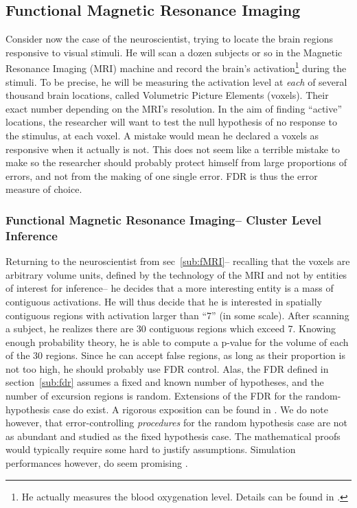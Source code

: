 \documentclass[review,12pt]{article}
\begin{document}
\subsection{\label{sub:fMRI}Functional Magnetic Resonance Imaging}

Consider now the case of the neuroscientist, trying to locate the brain regions responsive to visual stimuli. He will scan a dozen subjects or so in the Magnetic Resonance Imaging (MRI) machine and record the brain's activation\footnote{ He actually measures the blood oxygenation level. Details can be found in \cite{lazar_statistical_2008}.} during the stimuli. To be precise, he will be measuring the activation level at \emph{each} of several thousand brain locations, called Volumetric Picture Elements (voxels). Their exact number depending on the MRI's resolution. 
In the aim of finding ``active'' locations, the researcher will want to test the null hypothesis of no response to the stimulus, at each voxel. A mistake would mean he declared a voxels as responsive when it actually is not. This does not seem like a terrible mistake to make so the researcher should probably protect himself from large proportions of errors, and not from the making of one single error. FDR is thus the error measure of choice.


\subsubsection{Functional Magnetic Resonance Imaging-- Cluster Level Inference}
Returning to the neuroscientist from sec~\ref{sub:fMRI}-- recalling that the voxels are arbitrary volume units, defined by the technology of the MRI and not by entities of interest for inference-- he decides that a more interesting entity is a mass of contiguous activations. He will thus decide that he is interested in spatially contiguous regions with activation larger than ``7'' (in some scale). After scanning a subject, he realizes there are 30 contiguous regions which exceed 7. Knowing enough probability theory, he is able to compute a p-value for the volume of each of the 30 regions. Since he can accept false regions, as long as their proportion is not too high, he should probably use FDR control. Alas, the FDR defined in section~\ref{sub:fdr} assumes a fixed and known number of hypotheses, and the number of excursion regions is random. Extensions of the FDR for the random-hypothesis case do exist. A rigorous exposition can be found in  \citet{siegmund_false_2011}. We do note however, that error-controlling \emph{procedures} for the random hypothesis case are not as abundant and studied as the fixed hypothesis case. The mathematical proofs would typically require some hard to justify assumptions. Simulation performances however, do seem promising \citep{chumbley_false_2009,chumbley_topological_2010}.
\end{document}

